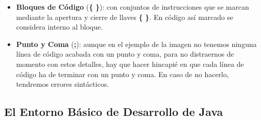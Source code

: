 \begin{itemize}
    \item \textbf{Bloques de Código} (\textbf{\{} \textbf{\}}): con conjuntos de instrucciones que se marcan mediante la apertura y cierre de llaves \textbf{\{} \textbf{\}}. En código así marcado se considera interno al bloque.

    \item \textbf{Punto y Coma} (\textbf{;}): aunque en el ejemplo de la imagen no tenemos ninguna línea de código acabada con un punto y coma, para no distraernos de momento con estos detalles, hay que hacer hincapié en que cada línea de código ha de terminar con un punto y coma. En caso de no hacerlo, tendremos errores sintácticos.
\end{itemize}

\subsection{El Entorno Básico de Desarrollo de Java}


\newpage
{}



